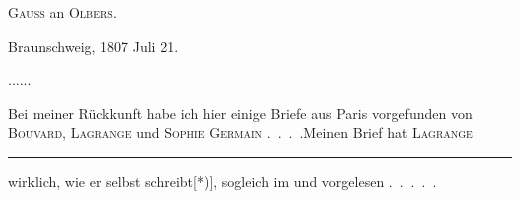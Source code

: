 \begin{center}\large\textsc{Gauss} an \textsc{Olbers}.\end{center}
\begin{flushright}Braunschweig, 1807 Juli 21.\end{flushright}
\noindent .\quad .\quad .\quad .\quad .\quad .\par
\par\indent Bei meiner Rückkunft habe ich hier einige Briefe aus Paris vorgefunden
von \textsc{Bouvard}, \textsc{Lagrange} und \textsc{Sophie Germain} .\ .\ .\ .\quad Meinen Brief hat \textsc{Lagrange}
\par\vfill\noindent\rule{.25\linewidth}{.4pt}\par\smallskip
\begingroup\footnotesize{}\par\endgroup
\clearpage
{}
\noindent wirklich, wie er selbst schreibt[*)], sogleich im  und  vorgelesen .\ .\ .\ .\ .

